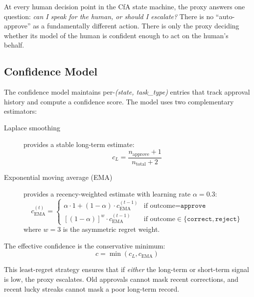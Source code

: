 \documentclass[11pt,a4paper]{article}
\begin{document}
At every human decision point in the CfA state machine, the proxy
answers one question: \emph{can I speak for the human, or should I
escalate?} There is no ``auto-approve'' as a fundamentally different
action. There is only the proxy deciding whether its model of the
human is confident enough to act on the human's behalf.

\subsection{Confidence Model}

The confidence model maintains per-\emph{(state, task\_type)} entries
that track approval history and compute a confidence score. The model
uses two complementary estimators:

\begin{description}
    \item[Laplace smoothing] provides a stable long-term estimate:
    \begin{equation}
        c_L = \frac{n_{\text{approve}} + 1}{n_{\text{total}} + 2}
    \end{equation}

    \item[Exponential moving average (EMA)] provides a recency-weighted
    estimate with learning rate $\alpha = 0.3$:
    \begin{equation}
        c_{\text{EMA}}^{(t)} = \begin{cases}
            \alpha \cdot 1 + (1-\alpha) \cdot c_{\text{EMA}}^{(t-1)}
                & \text{if outcome} = \texttt{approve} \\
            \left[(1-\alpha)\right]^{w} \cdot c_{\text{EMA}}^{(t-1)}
                & \text{if outcome} \in \{\texttt{correct}, \texttt{reject}\}
        \end{cases}
    \end{equation}
    where $w = 3$ is the asymmetric regret weight.
\end{description}

The effective confidence is the conservative minimum:
\begin{equation}
    c = \min(c_L, c_{\text{EMA}})
    \label{eq:confidence}
\end{equation}

This least-regret strategy ensures that if \emph{either} the long-term
or short-term signal is low, the proxy escalates. Old approvals cannot
mask recent corrections, and recent lucky streaks cannot mask a poor
long-term record.
\end{document}
